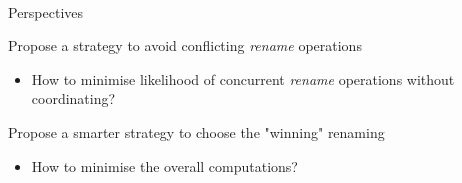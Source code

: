 \


\begin{frame}{Perspectives}
  \begin{block}{Propose a strategy to avoid conflicting \emph{rename} operations}
    \begin{itemize}
      \item How to minimise likelihood of concurrent \emph{rename} operations without coordinating?
    \end{itemize}
  \end{block}

  \begin{block}{Propose a smarter strategy to choose the "winning" renaming}
    \begin{itemize}
      \item How to minimise the overall computations?
    \end{itemize}
  \end{block}
\end{frame}
